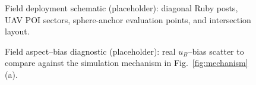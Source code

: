 \begin{figure}[!t]
  \centering
  \caption{Field deployment schematic (placeholder): diagonal Ruby posts, UAV POI
  sectors, sphere-anchor evaluation points, and intersection layout.}
  \label{fig:field_layout}
\end{figure}

\begin{figure}[!t]
  \centering
  \caption{Field aspect--bias diagnostic (placeholder): real $u_B$--bias scatter to
  compare against the simulation mechanism in Fig.~\ref{fig:mechanism}(a).}
  \label{fig:field_bias}
\end{figure}
